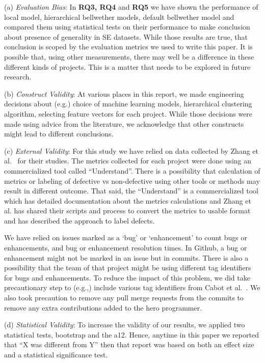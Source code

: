 \documentclass[10pt,journal,compsoc]{IEEEtran}
\begin{document}
(a) \textit{Evaluation Bias}: 
In  {\bf  RQ3, RQ4} and {\bf RQ5} we have shown the performance of local model, hierarchical bellwether models, default bellwether model and compared them using statistical tests on their performance to make conclusion about presence of generality in SE datasets. While those results are true, that conclusion is scoped by the evaluation metrics we used to write this paper. It is possible that, using other measurements, there may well be a difference in these different kinds of projects. This is a matter that needs to be explored in future research.  

    
(b) \textit{Construct Validity}: At various places in this report, we made engineering decisions about (e.g.) choice of machine learning models, hierarchical clustering algorithm, selecting feature vectors for each project. While those decisions were made using advice from the literature, we acknowledge that other constructs might lead to different conclusions. 

(c) \textit{External Validity}: For this study we have relied on data collected by Zhang et al.~\cite{zhang15} for their studies. The metrics collected for each project were done using an commercialized tool called ``Understand''. There is a possibility that calculation of metrics or labeling of defective vs non-defective using other tools or methods may result in different outcome. That said, the ``Understand'' is a commercialized tool which has detailed documentation about the metrics calculations and Zhang et al. has shared their scripts and process to convert the metrics to usable format and has described the approach to label defects.  

We have relied on issues marked as a `bug' or `enhancement' to count bugs or enhancements, and bug or enhancement resolution times. In Github, a bug or enhancement might not be marked in an issue but in commits. There is also a possibility that the team of that project might be using different tag identifiers for bugs and enhancements. To reduce the impact of this problem, we  did take precautionary step to (e.g.,) include various tag identifiers from Cabot et al.~\cite{cabot2015exploring}. We also took precaution to remove any pull merge requests from the commits to remove any extra contributions added to the hero programmer. 

(d) \textit{Statistical Validity}: To increase the validity of our results, we applied two statistical tests, bootstrap and the a12. Hence, anytime in this paper we reported that ``X was different from Y'' then that report was based on both an effect size and a statistical significance test.
 
\end{document}
